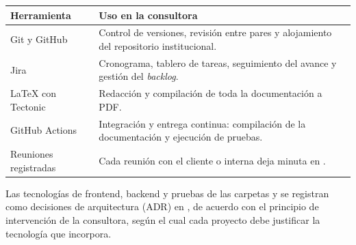 \begin{center}
\begin{tabularx}{\linewidth}{@{}L{3.6cm} Y@{}}
\toprule
\sffamily\bfseries\color{lgPrimario}Herramienta &
\sffamily\bfseries\color{lgPrimario}Uso en la consultora \\
\midrule
Git y GitHub & Control de versiones, revisión entre pares y alojamiento del repositorio institucional. \\
Jira & Cronograma, tablero de tareas, seguimiento del avance y gestión del \emph{backlog}. \\
\LaTeX{} con Tectonic & Redacción y compilación de toda la documentación a PDF. \\
GitHub Actions & Integración y entrega continua: compilación de la documentación y ejecución de pruebas. \\
Reuniones registradas & Cada reunión con el cliente o interna deja minuta en . \\
\bottomrule
\end{tabularx}
\end{center}

\begin{nota}
Las tecnologías de frontend, backend y pruebas de las carpetas  y
 se registran como decisiones de arquitectura (ADR) en
, de acuerdo con el principio de intervención de la
consultora, según el cual cada proyecto debe justificar la tecnología que
incorpora.
\end{nota}
